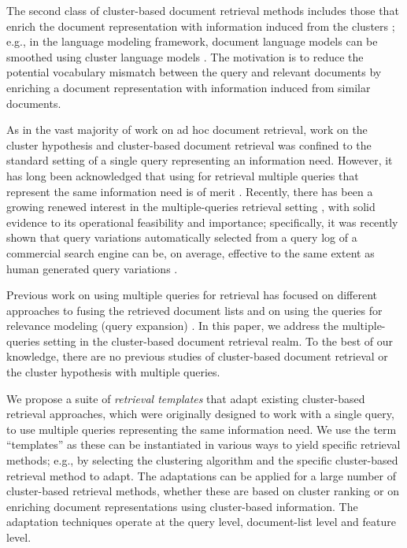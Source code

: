 The second class of cluster-based document retrieval methods includes those that enrich the document representation with information induced from the clusters \cite{Singhal+Pereira:99a,Kurland+Lee:04a,Liu+Croft:04a,Kurland:09a}; e.g., in the language modeling framework, document language models can be smoothed using cluster language models \cite{Kurland+Lee:04a,Liu+Croft:04a,Kurland:09a}. The motivation is to reduce the potential vocabulary mismatch between the query and relevant documents by enriching a document representation with information induced from similar documents.

As in the vast majority of work on ad hoc document retrieval, work on
the cluster hypothesis and cluster-based document retrieval was
confined to the standard setting of a single query representing an
information need. However, it has long been acknowledged that using
for retrieval multiple queries that represent the same information
need is of merit \cite{Belkin+al:93a,Belkin+al:95a}. Recently, there
has been a growing renewed interest in the multiple-queries retrieval
setting
\cite{bailey2016uqv100,bailey2017retrieval,bc17-adcs,Thomas+al:17a,Benham+al:19a,Liu+al:19a,Lu+al:19a,Zendel+al:19a}, with solid evidence to its operational feasibility and importance; specifically, it was recently shown that
query variations automatically selected from a query log of a commercial search engine can be, on average, effective to the same extent as human generated query
variations \cite{Liu+al:19a}. 

Previous work on using multiple queries for retrieval has focused on
different approaches to fusing the retrieved document lists 
\cite{Belkin+al:93a,Belkin+al:95a,Pickens+al:08a,bailey2017retrieval,bc17-adcs} and
on using the queries for relevance modeling (query expansion)
\cite{Lu+al:19a}. In this paper, we address the multiple-queries setting in the cluster-based document retrieval realm. To the best of our knowledge, there are no previous studies of cluster-based document retrieval or the cluster hypothesis with multiple queries.

We propose a suite of {\em retrieval templates} that adapt existing cluster-based retrieval approaches, which were originally designed to work with a single query, to use multiple queries representing the same information need. We use the term ``templates'' as these can be instantiated in various ways to yield specific retrieval methods; e.g., by selecting the clustering algorithm and the specific cluster-based retrieval method to adapt. The adaptations can be applied for a large number of cluster-based retrieval methods, whether these are based on cluster ranking or on enriching document representations using cluster-based information. The adaptation techniques operate at the query level, document-list level and feature level.

